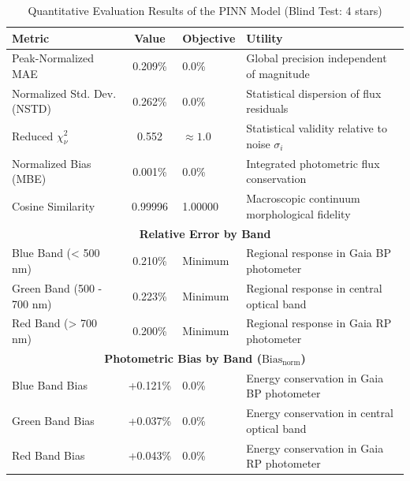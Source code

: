 
\begin{table}[htpb]
\centering
\caption{Quantitative Evaluation Results of the PINN Model (Blind Test: 4 stars)}
\label{tab:pinn_evaluation}
\begin{tabular}{lcll}
\hline
\textbf{Metric} & \textbf{Value} & \textbf{Objective} & \textbf{Utility} \\
\hline
Peak-Normalized MAE & 0.209\% & 0.0\% & Global precision independent of magnitude \\
Normalized Std. Dev. (NSTD) & 0.262\% & 0.0\% & Statistical dispersion of flux residuals \\
Reduced $\chi^2_\nu$ & 0.552 & $\approx 1.0$ & Statistical validity relative to noise $\sigma_i$ \\
Normalized Bias (MBE) & 0.001\% & 0.0\% & Integrated photometric flux conservation \\
Cosine Similarity & 0.99996 & 1.00000 & Macroscopic continuum morphological fidelity \\
\hline
\multicolumn{4}{c}{\textbf{Relative Error by Band}} \\
\hline
Blue Band (< 500 nm) & 0.210\% & Minimum & Regional response in Gaia BP photometer \\
Green Band (500 - 700 nm) & 0.223\% & Minimum & Regional response in central optical band \\
Red Band (> 700 nm) & 0.200\% & Minimum & Regional response in Gaia RP photometer \\
\hline
\multicolumn{4}{c}{\textbf{Photometric Bias by Band ($\text{Bias}_{\text{norm}}$)}} \\
\hline
Blue Band Bias & +0.121\% & 0.0\% & Energy conservation in Gaia BP photometer \\
Green Band Bias & +0.037\% & 0.0\% & Energy conservation in central optical band \\
Red Band Bias & +0.043\% & 0.0\% & Energy conservation in Gaia RP photometer \\
\hline
\end{tabular}
\end{table}
